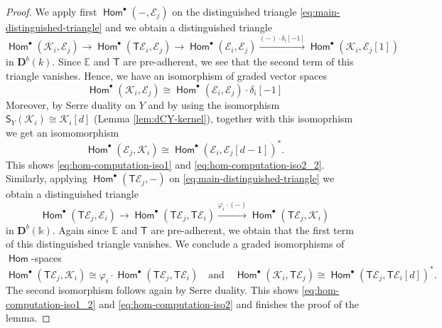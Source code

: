 \documentclass[a4paper,11pt, reqno]{amsart}
\def\E{\mathbb E}
\def\DD{\mathbf D}
\def\sE{\mathscr{E}}
\def\sK{\mathscr{K}}
\newcommand{\opname}[1]{\operatorname{\mathsf{#1}}}
\newcommand{\Hom}{\opname{Hom}}
\def\Db{\DD^b}
\newcommand{\bS}{\mathsf{S}}
\newcommand{\bT}{\mathsf{T}}
\theoremstyle{plain}
\theoremstyle{definition}
\numberwithin{equation}{section}
\newlength{\arrow}
\begin{document}
\begin{proof}
        We apply first $\Hom^\bullet ( - , \sE_j )$ on the distinguished triangle \eqref{eq:main-distinguished-triangle} and we obtain a distinguished triangle 
        \[
        \Hom^\bullet ( \sK_i , \sE_j ) \to \Hom^\bullet ( \bT  \sE_i  , \sE_j ) \to \Hom^\bullet ( \sE_i , \sE_j ) \xrightarrow{(-)\cdot \delta_i [-1]} \Hom^\bullet ( \sK_i , \sE_j [1] ) 
        \]
        in $\Db (k)$.
        Since $\E$ and $\bT$ are pre-adherent, we see that the second term of this triangle vanishes.
        Hence, we have an isomorphism of graded vector spaces
        \[
         \Hom^\bullet ( \sK_i , \sE_j ) \cong \Hom^\bullet (\sE_i , \sE_j ) \cdot \delta_i [-1]    
        \]
        Moreover, by Serre duality on $Y$ and by using the isomorphism $\bS_Y ( \sK_i ) \cong \sK_i [d]$ (Lemma \ref{lem:dCY-kernel}), together with this isomoprhism we get an isomomorphism
        \[
        \Hom^\bullet (  \sE_j ,   \sK_i  ) \cong \Hom^\bullet ( \sE_i ,  \sE_j [d-1] )^\ast .
        \]
        This shows \eqref{eq:hom-computation-iso1} and \eqref{eq:hom-computation-iso2_2}.
        Similarly, applying $\Hom^\bullet ( \bT  \sE_j  , - )$ on  \eqref{eq:main-distinguished-triangle} we obtain a distinguished triangle
        \[
        \Hom^\bullet ( \bT  \sE_j  , \sE_i ) \to \Hom^\bullet ( \bT  \sE_j  , \bT  \sE_i   ) \xrightarrow{\varphi_i \cdot (-)} \Hom^\bullet ( \bT  \sE_j  , \sK_i ) 
        \]
        in $\Db(\mathbb{k})$.
        Again since $\E$ and $\bT$ are pre-adherent, we obtain that the first term of this distinguished triangle vanishes.
        We conclude a graded isomorphisms of $\Hom$-spaces
\[
    \Hom^\bullet ( \bT  \sE_j  , \sK_i ) \cong  \varphi_i \cdot  \Hom^\bullet ( \bT  \sE_j    , \bT  \sE_i   )  \quad \text{and} \quad  \Hom^\bullet (  \sK_i , \bT  \sE_j  ) \cong \Hom^\bullet ( \bT \sE_j , \bT \sE_i [d] )^\ast .
\]
The second isomorphism follows again by Serre duality.
This shows \eqref{eq:hom-computation-iso1_2} and \eqref{eq:hom-computation-iso2} and finishes the proof of the lemma.
\end{proof}
\end{document}
